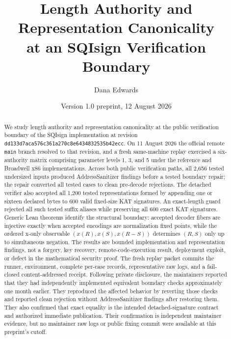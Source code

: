 \documentclass[11pt]{article}
\title{Length Authority and Representation Canonicality\\
at an SQIsign Verification Boundary}
\author{Dana Edwards}
\date{Version 1.0 preprint, 12 August 2026}
\newcommand{\code}[1]{\texttt{#1}}
\begin{document}
\maketitle

\begin{center}
\end{center}

\begin{abstract}
We study length authority and representation canonicality at the public
verification boundary of the SQIsign implementation at revision
\code{dd133d7aca576c361a270c8e6434832535b42ecc}.  On 11 August 2026 the
official remote \code{main} branch resolved to that revision, and a fresh
same-machine replay exercised a six-authority matrix comprising parameter
levels 1, 3, and 5 under the reference and Broadwell x86 implementations.
Across both public verification
paths, all 2,656 tested undersized inputs produced AddressSanitizer findings
before a tested boundary repair; the repair converted all tested cases to
clean pre-decode rejections.  The detached verifier also accepted all 1,200
tested representations formed by appending one or sixteen declared bytes to
600 valid fixed-size KAT signatures.  An exact-length guard rejected all such
tested suffix aliases while preserving all 600 exact KAT signatures.  Generic
Lean theorems identify the structural boundary:
accepted decoder fibers are injective exactly when accepted encodings are
normalization fixed points, while the ordered x-only observable
$(x(R),x(S),x(R-S))$ determines $(R,S)$ only up to simultaneous negation.
The results are bounded implementation and representation findings, not a
forgery, key recovery, remote-code-execution result, deployment exploit, or
defect in the mathematical security proof.  The fresh replay packet commits
the runner, environment, complete per-case records, representative raw logs,
and a fail-closed content-addressed receipt.  Following private disclosure,
the maintainers reported that they had independently implemented equivalent
boundary checks approximately one month earlier.  They reproduced the affected
behavior by reverting those checks and reported clean rejection without
AddressSanitizer findings after restoring them.  They also confirmed that exact
equality is the intended detached-signature contract and authorized immediate
publication.  Their confirmation is independent maintainer evidence, but no
maintainer raw logs or public fixing commit were available at this preprint's
cutoff.
\end{abstract}
\end{document}
